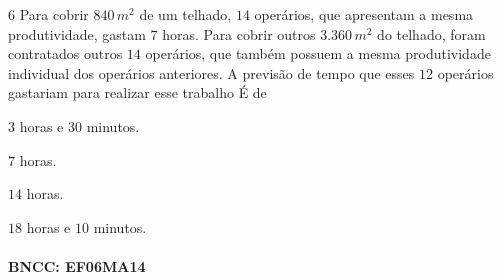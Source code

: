 {%

\num{6}  Para cobrir $840\,m^2$ de um telhado, $14$ operários, que apresentam a
mesma produtividade, gastam $7$ horas. Para cobrir outros $3.360\,m^2$ do
telhado, foram contratados outros $14$ operários, que também possuem a
mesma produtividade individual dos operários anteriores. A previsão de
tempo que esses $12$ operários gastariam para realizar esse trabalho É de

\begin{escolha}
\item $3$ horas e $30$ minutos.
\item $7$ horas.
\item $14$ horas.
\item $18$ horas e $10$ minutos.
\end{escolha}

\paragraph{BNCC: EF06MA14 }


}
